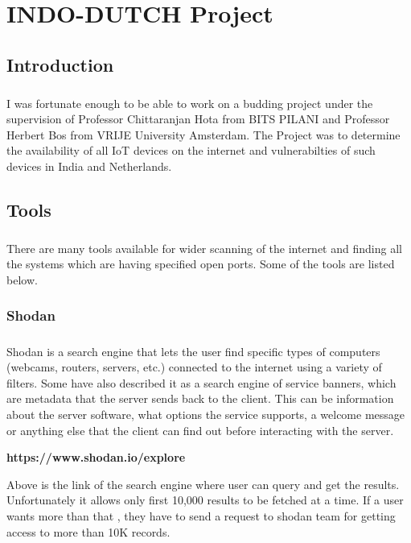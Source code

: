\documentclass{report}
\begin{document}

\chapter{INDO-DUTCH Project}


\section{Introduction}
\paragraph{}
I was fortunate enough to be able to work on a budding project under the supervision of Professor Chittaranjan Hota from BITS PILANI and Professor Herbert Bos from VRIJE University Amsterdam. The Project was to determine the availability of all IoT devices on the internet and vulnerabilties of such devices in India and Netherlands. 

\section{Tools}
\paragraph{}
There are many tools available for wider scanning of the internet and finding all the systems which are having specified open ports. Some of the tools are listed below.

\subsection{Shodan}
\paragraph{}
Shodan is a search engine that lets the user find specific types of computers (webcams, routers, servers, etc.) connected to the internet using a variety of filters. Some have also described it as a search engine of service banners, which are metadata that the server sends back to the client. This can be information about the server software, what options the service supports, a welcome message or anything else that the client can find out before interacting with the server.
\begin{center}
\textbf{https://www.shodan.io/explore} 
\end{center}
Above is the link of the search engine where user can query and get the results. Unfortunately it allows only first 10,000 results to be fetched at a time. If a user wants more than that , they have to send a request to shodan team for getting access to more than 10K records.
\end{document}
